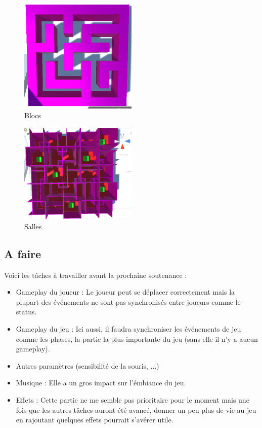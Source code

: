 \documentclass{article}
\begin{document}
\par\vspace{0.5cm}
\begin{figure}[!ht]
    \centering
    \includegraphics[width=0.5\textwidth]{Blocs.PNG}
    \caption{Blocs}
    \label{Blocs}
\end{figure}{}

\par\vspace{0.5cm}
\begin{figure}[!ht]
    \centering
    \includegraphics[width=0.5\textwidth]{Salles.PNG}
    \caption{Salles}
    \label{Salles}
\end{figure}{}

\newpage
\subsection{A faire}

Voici les tâches à travailler avant la prochaine soutenance :

\begin{itemize}
\item Gameplay du joueur : Le joueur peut se déplacer correctement mais la plupart des événements ne sont pas synchronisés entre joueurs comme le status.
\item Gameplay du jeu : Ici aussi, il faudra synchroniser les événements de jeu comme les phases, la partie la plus importante du jeu (sans elle il n'y a aucun gameplay).
\item Autres paramètres (sensibilité de la souris, ...)
\item Musique : Elle a un gros impact sur l'émbiance du jeu.
\item Effets : Cette partie ne me semble pas prioritaire pour le moment mais une fois que les autres tâches auront été avancé, donner un peu plus de vie au jeu en rajoutant quelques effets pourrait s'avérer utile.
\end{itemize}
\end{document}
